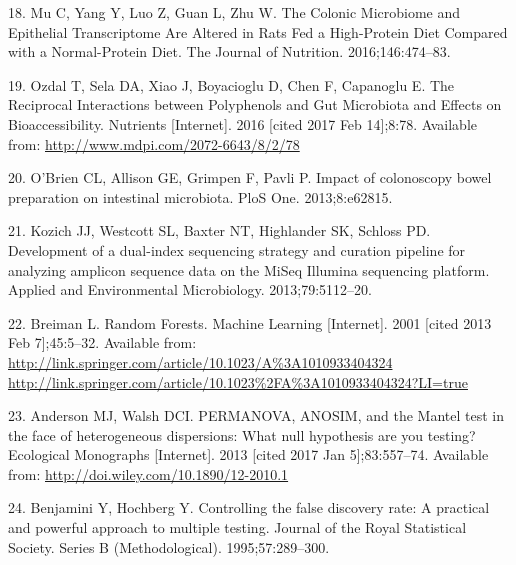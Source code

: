 \documentclass[12pt,]{article}
\begin{document}
\hypertarget{ref-mu_colonic_2016}{}
18. Mu C, Yang Y, Luo Z, Guan L, Zhu W. The Colonic Microbiome and
Epithelial Transcriptome Are Altered in Rats Fed a High-Protein Diet
Compared with a Normal-Protein Diet. The Journal of Nutrition.
2016;146:474--83.

\hypertarget{ref-ozdal_reciprocal_2016}{}
19. Ozdal T, Sela DA, Xiao J, Boyacioglu D, Chen F, Capanoglu E. The
Reciprocal Interactions between Polyphenols and Gut Microbiota and
Effects on Bioaccessibility. Nutrients {[}Internet{]}. 2016 {[}cited
2017 Feb 14{]};8:78. Available from:
\url{http://www.mdpi.com/2072-6643/8/2/78}

\hypertarget{ref-obrien_impact_2013}{}
20. O'Brien CL, Allison GE, Grimpen F, Pavli P. Impact of colonoscopy
bowel preparation on intestinal microbiota. PloS One. 2013;8:e62815.

\hypertarget{ref-kozich_development_2013}{}
21. Kozich JJ, Westcott SL, Baxter NT, Highlander SK, Schloss PD.
Development of a dual-index sequencing strategy and curation pipeline
for analyzing amplicon sequence data on the MiSeq Illumina sequencing
platform. Applied and Environmental Microbiology. 2013;79:5112--20.

\hypertarget{ref-breiman_random_2001}{}
22. Breiman L. Random Forests. Machine Learning {[}Internet{]}. 2001
{[}cited 2013 Feb 7{]};45:5--32. Available from:
\href{http://link.springer.com/article/10.1023/A\%3A1010933404324\%20http://link.springer.com/article/10.1023\%2FA\%3A1010933404324?LI=true}{http://link.springer.com/article/10.1023/A\%3A1010933404324 http://link.springer.com/article/10.1023\%2FA\%3A1010933404324?LI=true}

\hypertarget{ref-anderson_permanova_2013}{}
23. Anderson MJ, Walsh DCI. PERMANOVA, ANOSIM, and the Mantel test in
the face of heterogeneous dispersions: What null hypothesis are you
testing? Ecological Monographs {[}Internet{]}. 2013 {[}cited 2017 Jan
5{]};83:557--74. Available from:
\url{http://doi.wiley.com/10.1890/12-2010.1}

\hypertarget{ref-benjamini_controlling_1995}{}
24. Benjamini Y, Hochberg Y. Controlling the false discovery rate: A
practical and powerful approach to multiple testing. Journal of the
Royal Statistical Society. Series B (Methodological). 1995;57:289--300.
\end{document}

